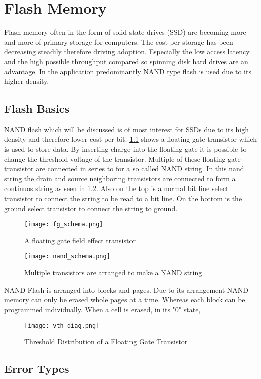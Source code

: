 
\chapter{Flash Memory}
Flash memory often in the form of solid state drives (SSD) are becoming more and more of primary storage for computers. The cost per storage has been decreasing steadily therefore driving adoption. Especially the low access latency and the high possible throughput compared so spinning disk hard drives are an advantage. In the application predominantly NAND type flash is used due to its higher density. 


\section{Flash Basics}
NAND flash which will be discussed is of most interest for SSDs due to its high density and therefore lower cost per bit. \cref{fg_tans} shows a floating gate transistor which is used to store data. By inserting charge into the floating gate it is possible to change the threshold voltage of the transistor. Multiple of these floating gate transistor are connected in series to for a so called NAND string. In this nand string the drain and source neighboring transistors are connected to form a continuos string as seen in \cref{nand_string}. Also on the top is a normal bit line select transistor to connect the string to be read to a bit line. On the bottom is the ground select transistor to connect the string to ground\cite[p.~22-24]{MiMa18}.

\begin{figure}
    \texttt{[image: fg\_schema.png]}
    \centering
    \caption{A floating gate field effect transistor}
    \label{fg_tans}
\end{figure}


\begin{figure}
    \texttt{[image: nand\_schema.png]}
    \centering
    \caption{Multiple transistors are arranged to make a NAND string}
    \label{nand_string}
\end{figure}

NAND Flash is arranged into blocks and pages. Due to its arrangement NAND memory can only be erased whole pages at a time. Whereas each block can be programmed individually. When a cell is erased, in its "0" state,  

\begin{figure}
    \texttt{[image: vth\_diag.png]}
    \centering
    \caption{Threshold Distribution of a Floating Gate Transistor}
    \label{nand_th}
\end{figure}

\section{Error Types}


\cite{ZaTu16}